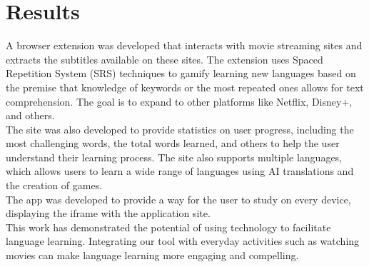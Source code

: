 \documentclass[12pt]{article}
\begin{document}
\section{Results}
A browser extension was developed that interacts with movie streaming sites and extracts the subtitles available on these sites. The extension uses Spaced Repetition System (SRS) techniques to gamify learning new languages based on the premise that knowledge of keywords or the most repeated ones allows for text comprehension. The goal is to expand to other platforms like Netflix, Disney+, and others. \\ 
The site was also developed to provide statistics on user progress, including the most challenging words, the total words learned, and others to help the user understand their learning process. The site also supports multiple languages, which allows users to learn a wide range of languages using AI translations and the creation of games.  \\
The app was developed to provide a way for the user to study on every device, displaying the iframe with the application site.\\
This work has demonstrated the potential of using technology to facilitate language learning. Integrating our tool with everyday activities such as watching movies can make language learning more engaging and compelling. 
\end{document}
